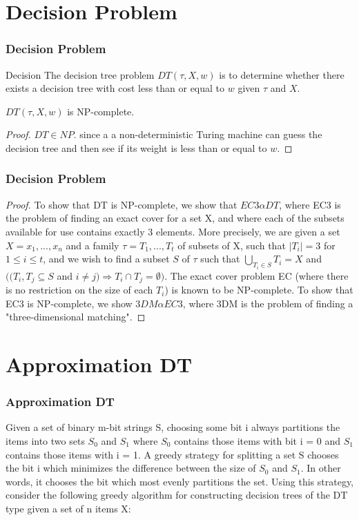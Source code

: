 \documentclass{beamer}
\begin{document}
\section{Decision Problem}
\begin{frame}
	\frametitle{Decision Problem}
	\begin{block}{Decision}
		The decision tree problem $DT(\tau, X, w)$ is to determine whether there exists a decision tree with 
		cost less than or equal to $w$ given $\tau$ and $X$.
	\end{block}
	\begin{theorem}
		$DT(\tau, X, w)$ is NP-complete.
	\end{theorem}
	\begin{proof}
		$DT\in NP$. since a a non-deterministic Turing machine can guess the decision tree and then see if its
		weight is less than or equal to $w$.
	\end{proof}
\end{frame}

\begin{frame}
	\frametitle{Decision Problem}
	\begin{proof}
		To show that DT is NP-complete, we show that $EC3 \alpha DT$, where EC3 is the problem of finding
		an exact cover for a set X, and where each of the subsets available for use contains exactly 3 elements.
		More precisely, we are given a set $X={x_1,... , x_n}$ and a family $\tau = {T_1,... , T_t}$ of subsets
		of X, such that $|T_i|=3$ for $1\le i \le t$, and we wish to find a subset $S$ of $\tau$ such that
		$\bigcup\limits_{T_i \in S} T_{i} = X$ and $(({T_i, T_j}\subseteq S$ and 
		$i\ne j) \Rightarrow T_i \cap T_j = \emptyset)$. The exact cover problem EC (where there is no restriction on the size of each $T_i$) is known to be NP-complete. To show that EC3 is NP-complete,
		we show $3DM \alpha EC3$, where 3DM is the problem of finding a "three-dimensional matching".
	\end{proof}
\end{frame}

\section{Approximation DT}
\begin{frame}
	\frametitle{Approximation DT}
	Given a set of binary m-bit strings S, choosing some bit i always partitions the items into two sets $S_0$ and $S_1$ where $S_0$ contains those items with bit i = 0 and $S_1$ contains those items with i = 1. A greedy strategy
	for splitting a set S chooses the bit i which minimizes the difference between the size of $S_0$ and $S_1$. In other
	words, it chooses the bit which most evenly partitions the set. Using this strategy, consider the following
	greedy algorithm for constructing decision trees of the DT type given a set of n items X:
\end{frame}	
\end{document}
